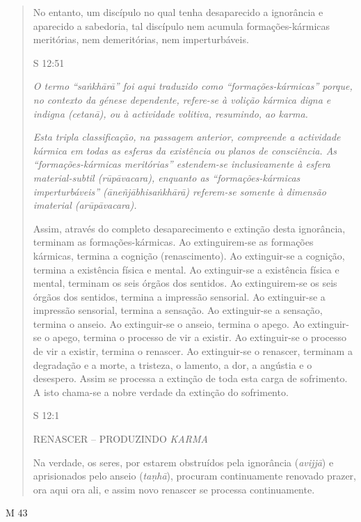 \begin{quote}
No entanto, um discípulo no qual tenha desaparecido a ignorância e aparecido a sabedoria, tal discípulo nem acumula formações-kármicas meritórias, nem demeritórias, nem imperturbáveis.

S 12:51

\emph{O termo ``saṅkhārā'' foi aqui traduzido como ``formações-kármicas'' porque, no contexto da génese dependente, refere-se à volição kármica digna e indigna (cetanā), ou à actividade volitiva, resumindo, ao karma.}

\emph{Esta tripla classificação, na passagem anterior, compreende a actividade kármica em todas as esferas da existência ou planos de consciência. As ``formações-kármicas meritórias'' estendem-se inclusivamente à esfera material-subtil (rūpāvacara), enquanto as ``formações-kármicas imperturbáveis'' (āneñjābhisaṅkhārā) referem-se somente à dimensão imaterial (arūpāvacara).}

Assim, através do completo desaparecimento e extinção desta ignorância, terminam as formações-kármicas. Ao extinguirem-se as formações kármicas, termina a cognição (renascimento). Ao extinguir-se a cognição, termina a existência física e mental. Ao extinguir-se a existência física e mental, terminam os seis órgãos dos sentidos. Ao extinguirem-se os seis órgãos dos sentidos, termina a impressão sensorial. Ao extinguir-se a impressão sensorial, termina a sensação. Ao extinguir-se a sensação, termina o anseio. Ao extinguir-se o anseio, termina o apego. Ao extinguir-se o apego, termina o processo de vir a existir. Ao extinguir-se o processo de vir a existir, termina o renascer. Ao extinguir-se o renascer, terminam a degradação e a morte, a tristeza, o lamento, a dor, a angústia e o desespero. Assim se processa a extinção de toda esta carga de sofrimento. A isto chama-se a nobre verdade da extinção do sofrimento.

S 12:1

RENASCER -- PRODUZINDO \emph{KARMA}

Na verdade, os seres, por estarem obstruídos pela ignorância (\emph{avijjā}) e aprisionados pelo anseio (\emph{taṇhā}), procuram continuamente renovado prazer, ora aqui ora ali, e assim novo renascer se processa continuamente.
\end{quote}

M 43

